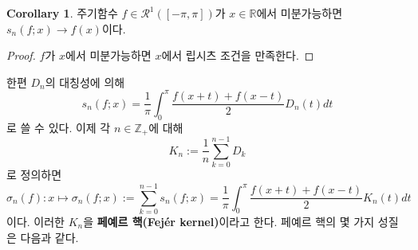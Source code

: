\documentclass[11pt]{book}
\numberwithin{equation}{chapter}
\def\ZZ{\mathbb{Z}}
\def\RR{\mathbb{R}}
\def\calR{\mathcal{R}}
\theoremstyle{definition}
\newtheorem{cor}[thm]{Corollary}
\begin{document}
\begin{cor}
    주기함수 \(f \in \calR^1([-\pi, \pi])\)가 \(x \in \RR\)에서 미분가능하면 \(s_n(f; x) \to f(x)\)이다.
\end{cor}
\begin{proof}
    \(f\)가 \(x\)에서 미분가능하면 \(x\)에서 립시츠 조건을 만족한다.
\end{proof}

한편 \(D_n\)의 대칭성에 의해
\[
    s_n(f; x) = \frac{1}{\pi} \int_0^\pi \frac{f(x+t) + f(x-t)}{2} D_n(t) dt
\]
로 쓸 수 있다. 이제 각 \(n \in \ZZ_+\)에 대해
\[
    K_n := \frac{1}{n} \sum_{k=0}^{n-1} D_k
\]
로 정의하면
\[
    \sigma_n(f) : x \mapsto \sigma_n(f; x) := \sum_{k=0}^{n-1} s_n(f; x) = \frac{1}{\pi} \int_0^\pi \frac{f(x+t) + f(x-t)}{2} K_n(t) dt
\]
이다. 이러한 \(K_n\)을 \textbf{페예르 핵(Fej\'er kernel)}이라고 한다. 페예르 핵의 몇 가지 성질은 다음과 같다.
\end{document}
